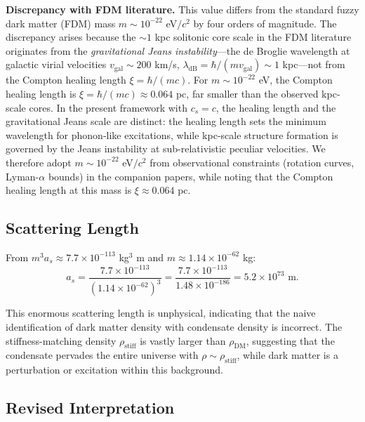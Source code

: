\documentclass[11pt,a4paper]{article}
\newcommand{\rhostiff}{\ensuremath{\rho_{\mathrm{stiff}}}}
\theoremstyle{definition}
\theoremstyle{remark}
\begin{document}
\textbf{Discrepancy with FDM literature.} This value differs from the standard fuzzy dark matter (FDM) mass $m \sim 10^{-22}$ eV$/c^2$ by four orders of magnitude. The discrepancy arises because the $\sim 1$ kpc solitonic core scale in the FDM literature originates from the \emph{gravitational Jeans instability}---the de Broglie wavelength at galactic virial velocities $v_{\mathrm{gal}} \sim 200$ km/s, $\lambda_{\mathrm{dB}} = \hbar/(m v_{\mathrm{gal}}) \sim 1$ kpc---not from the Compton healing length $\xi = \hbar/(mc)$. For $m \sim 10^{-22}$ eV, the Compton healing length is $\xi = \hbar/(mc) \approx 0.064$ pc, far smaller than the observed kpc-scale cores. In the present framework with $c_s = c$, the healing length and the gravitational Jeans scale are distinct: the healing length sets the minimum wavelength for phonon-like excitations, while kpc-scale structure formation is governed by the Jeans instability at sub-relativistic peculiar velocities. We therefore adopt $m \sim 10^{-22}$ eV$/c^2$ from observational constraints (rotation curves, Lyman-$\alpha$ bounds) in the companion papers, while noting that the Compton healing length at this mass is $\xi \approx 0.064$ pc.

\subsection{Scattering Length}
\label{sec:scattering_length}

From $m^3 a_s \approx 7.7 \times 10^{-113}$ kg$^3$ m and $m \approx 1.14 \times 10^{-62}$ kg:
\begin{equation}
a_s = \frac{7.7 \times 10^{-113}}{(1.14 \times 10^{-62})^3} = \frac{7.7 \times 10^{-113}}{1.48 \times 10^{-186}} = 5.2 \times 10^{73} \text{ m}.
\end{equation}

This enormous scattering length is unphysical, indicating that the naive identification of dark matter density with condensate density is incorrect. The stiffness-matching density $\rhostiff$ is vastly larger than $\rho_{\mathrm{DM}}$, suggesting that the condensate pervades the entire universe with $\rho \sim \rhostiff$, while dark matter is a perturbation or excitation within this background.

\subsection{Revised Interpretation}
\label{sec:revised_interpretation}
\end{document}
